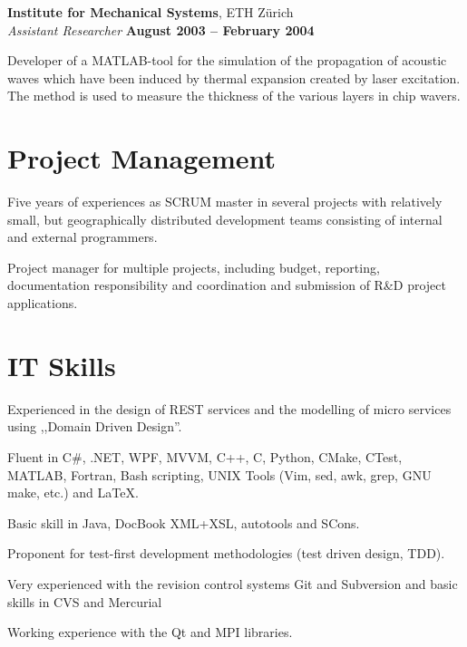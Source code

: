 \documentclass[line,11pt,a4paper]{../resume}
\begin{document}
\begin{resume}
\textbf{Institute for Mechanical Systems}, ETH Z\"urich \vspace{2mm}\\\vspace{1mm}%
\textsl{Assistant Researcher} \hfill \textbf{August 2003 -- February 2004}\\
\begin{list2}
  \item Developer of a MATLAB-tool for the simulation of the propagation of
    acoustic waves which have been induced by thermal expansion created by
    laser excitation. The method is used to measure the thickness of the
    various layers in chip wavers.
\end{list2}

\section{\mysidestyle Project Management}\vspace{6mm}
\begin{list2}
  \item Five years of experiences as SCRUM master in several projects with
    relatively small, but geographically distributed development teams
    consisting of internal and external programmers.

  \item Project manager for multiple projects, including budget, reporting,
    documentation responsibility and coordination and submission of R\&D
    project applications.
\end{list2}

\pagebreak
\section{\mysidestyle IT Skills}\vspace{6mm}
\begin{list2}
  \item Experienced in the design of REST services and the modelling of micro
    services using ,,Domain Driven Design''.
  \item Fluent in C\#, .NET, WPF, MVVM, C++, C, Python, CMake, CTest, MATLAB,
    Fortran, Bash scripting, UNIX Tools (Vim, sed, awk, grep, GNU make, etc.)
    and {\selectfont\LaTeX}.
  \item Basic skill in Java, DocBook XML+XSL, autotools and SCons.
  \item Proponent for test-first development methodologies (test driven design,
    TDD).
  \item Very experienced with the revision control systems Git and Subversion
    and basic skills in CVS and Mercurial
  \item Working experience with the Qt and MPI libraries.
\end{list2}


\end{resume}
\end{document}

